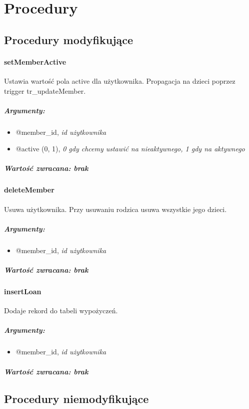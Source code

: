 \documentclass[12pt,a4paper,titlepage]{article}
\begin{document}

\newpage

\section{Procedury}
\subsection{Procedury modyfikujące}
\paragraph{setMemberActive}
Ustawia wartość pola active dla użytkownika. Propagacja na dzieci poprzez trigger tr\_updateMember.
\subparagraph{Argumenty:}
\begin{itemize}
	\item @member\_id, \textit{id użytkownika}
	\item @active (0, 1), \textit{0 gdy chcemy ustawić na nieaktywnego, 1 gdy na aktywnego}
\end{itemize}
\subparagraph{Wartość zwracana: brak}

\paragraph{deleteMember}
Usuwa użytkownika. Przy usuwaniu rodzica usuwa wszystkie jego dzieci.
\subparagraph{Argumenty:}
\begin{itemize}
	\item @member\_id, \textit{id użytkownika}
\end{itemize}
\subparagraph{Wartość zwracana: brak}

\paragraph{insertLoan}
Dodaje rekord do tabeli wypożyczeń.
\subparagraph{Argumenty:}
\begin{itemize}
	\item @member\_id, \textit{id użytkownika}
\end{itemize}
\subparagraph{Wartość zwracana: brak}

\subsection{Procedury niemodyfikujące}
\end{document}
